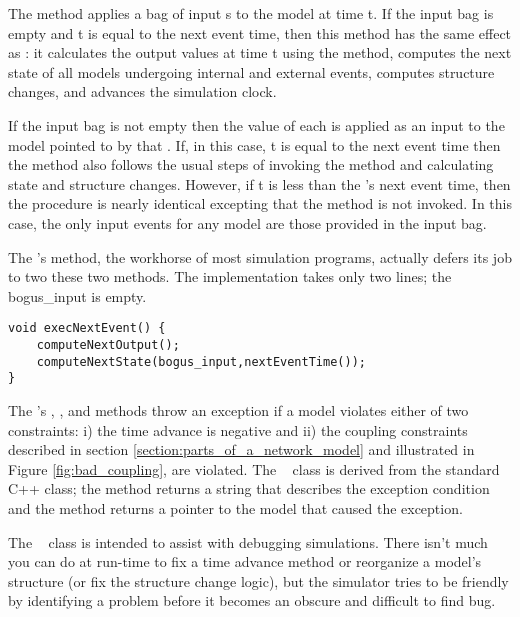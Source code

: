 The  method applies a bag of input s to the model at time t. If the input bag is empty and t is equal to the next event time, then this method has the same effect as : it calculates the output values at time t using the  method, computes the next state of all models undergoing internal and external events, computes structure changes, and advances the simulation clock.

If the input bag is not empty then the value of each  is applied as an input to the model pointed to by that . If, in this case, t is equal to the next event time then the method also follows the usual steps of invoking the  method and calculating state and structure changes. However, if t is less than the 's next event time, then the procedure is nearly identical excepting that the  method is not invoked. In this case, the only input events for any model are those provided in the input bag.

The 's  method, the workhorse of most simulation programs, actually defers its job to two these two methods. The implementation takes only two lines; the  bogus\_input is empty.
\begin{verbatim}
void execNextEvent() {
    computeNextOutput();
    computeNextState(bogus_input,nextEventTime());
}
\end{verbatim}

The 's , , and  methods throw an exception if a model violates either of two constraints: i) the time advance is negative and ii) the coupling constraints described in section \ref{section:parts_of_a_network_model} and illustrated in Figure \ref{fig:bad_coupling}, are violated. The \adevs\  class is derived from the standard C++  class; the method  returns a string that describes the exception condition and the method  returns a pointer to the model that caused the exception.

The \adevs\  class is intended to assist with debugging simulations. There isn't much you can do at run-time to fix a time advance method or reorganize a model's structure (or fix the structure change logic), but the simulator tries to be friendly by identifying a problem before it becomes an obscure and difficult to find bug.
